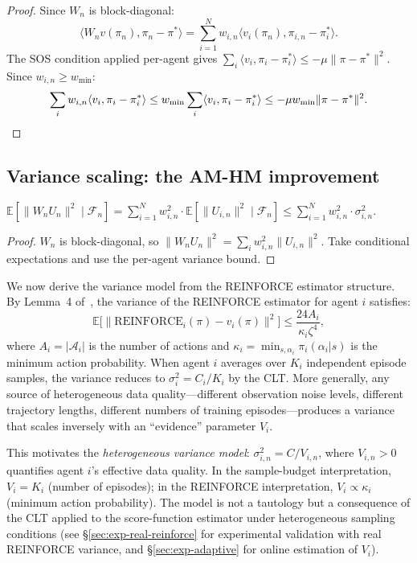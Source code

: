 \begin{proof}
Since $W_n$ is block-diagonal:
\[
    \langle W_n v(\pi_n), \pi_n - \pi^* \rangle = \sum_{i=1}^N w_{i,n} \langle v_i(\pi_n), \pi_{i,n} - \pi_i^* \rangle.
\]
The SOS condition applied per-agent gives $\sum_i \langle v_i, \pi_i - \pi_i^* \rangle \leq -\mu \|\pi - \pi^*\|^2$. Since $w_{i,n} \geq w_{\min}$:
\[
    \sum_{i} w_{i,n} \langle v_i, \pi_i - \pi_i^* \rangle \leq w_{\min} \sum_i \langle v_i, \pi_i - \pi_i^* \rangle \leq -\mu w_{\min} \|\pi - \pi^*\|^2. \qedhere
\]
\end{proof}


\subsection{Variance scaling: the AM-HM improvement}

\begin{lemma}
\label{lem:var-scaling-ch3}
$\mathbb{E}[\|W_n U_n\|^2 \mid \mathcal{F}_n] = \sum_{i=1}^N w_{i,n}^2 \cdot \mathbb{E}[\|U_{i,n}\|^2 \mid \mathcal{F}_n] \leq \sum_{i=1}^N w_{i,n}^2 \cdot \sigma_{i,n}^2$.
\end{lemma}

\begin{proof}
$W_n$ is block-diagonal, so $\|W_n U_n\|^2 = \sum_i w_{i,n}^2 \|U_{i,n}\|^2$. Take conditional expectations and use the per-agent variance bound.
\end{proof}

We now derive the variance model from the REINFORCE estimator structure. By Lemma~4 of~\cite{giannou2022}, the variance of the REINFORCE estimator for agent $i$ satisfies:
\begin{equation}
\label{eq:reinforce-variance}
    \mathbb{E}\bigl[\|\mathrm{REINFORCE}_i(\pi) - v_i(\pi)\|^2\bigr] \leq \frac{24 A_i}{\kappa_i \zeta^4},
\end{equation}
where $A_i = |\mathcal{A}_i|$ is the number of actions and $\kappa_i = \min_{s,\alpha_i} \pi_i(\alpha_i | s)$ is the minimum action probability. When agent $i$ averages over $K_i$ independent episode samples, the variance reduces to $\sigma_{i}^2 = C_i / K_i$ by the CLT. More generally, any source of heterogeneous data quality---different observation noise levels, different trajectory lengths, different numbers of training episodes---produces a variance that scales inversely with an ``evidence'' parameter $V_i$.

This motivates the \emph{heterogeneous variance model}: $\sigma_{i,n}^2 = C/V_{i,n}$, where $V_{i,n} > 0$ quantifies agent $i$'s effective data quality. In the sample-budget interpretation, $V_i = K_i$ (number of episodes); in the REINFORCE interpretation, $V_i \propto \kappa_i$ (minimum action probability). The model is not a tautology but a consequence of the CLT applied to the score-function estimator under heterogeneous sampling conditions (see \S\ref{sec:exp-real-reinforce} for experimental validation with real REINFORCE variance, and \S\ref{sec:exp-adaptive} for online estimation of $V_i$).

